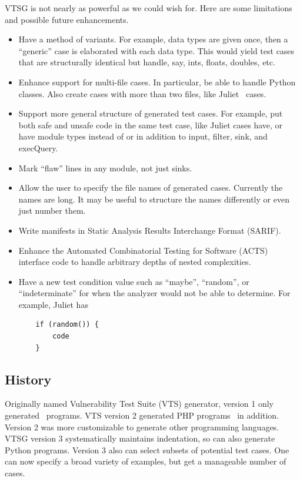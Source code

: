 VTSG is not nearly as powerful as we could wish for.  Here are some limitations and
possible future enhancements.
\begin{itemize}
  \item Have a method of variants.  For example, data types are given once, then a
    ``generic'' case is elaborated with each data type.  This would yield test cases
    that are structurally identical but handle, say, ints, floats, doubles, etc.
  \item Enhance support for multi-file cases.  In particular, be able to handle
    Python classes.  Also create cases with more than two files, like
    Juliet~\cite{Black2018Juliet1.3changes} cases.
  \item Support more general structure of generated test cases.  For example, put both
    safe and unsafe code in the same test case, like Juliet cases have, or have
    module types instead of or in addition to input, filter, sink, and execQuery.
  \item Mark ``flaw'' lines in any module, not just sinks.
  \item Allow the user to specify the file names of generated cases.  Currently the
    names are long.  It may be useful to structure the names differently or
    even just number them.
  \item Write manifests in Static Analysis Results Interchange Format (SARIF).
  \item Enhance the Automated Combinatorial Testing for Software (ACTS) interface
    code to handle arbitrary depths of nested
    complexities.
  \item Have a new test condition value such as ``maybe'', ``random'', or
    ``indeterminate'' for when the analyzer would not be able to determine.  For
    example, Juliet has
    \begin{verbatim}
    if (random()) {
        code
    }
    \end{verbatim}
\end{itemize}


\subsection{History}

Originally named Vulnerability Test Suite (VTS) generator, version 1 only
generated \CSharp\ programs. VTS version 2 generated PHP
programs~\cite{StivaletFongVTSPHP2016} in addition.  Version 2 was more
customizable to generate other programming languages.
VTSG version 3 systematically maintains indentation, so can also generate Python
programs.
Version 3 also can select subsets of potential test cases.  One can now specify a
broad variety of examples, but get a manageable number of cases.

